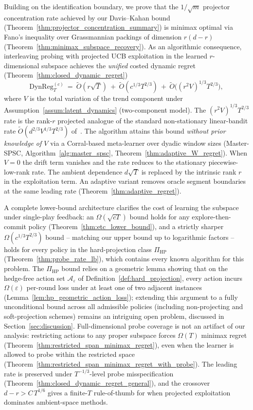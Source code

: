 \documentclass[11pt]{article}
\newcommand{\cA}{\mathcal{A}}
\newcommand{\DynReg}{\mathrm{DynReg}}
\begin{document}
Building on the identification boundary, we prove that the
$1/\sqrt{m}$ projector concentration rate achieved by our Davis--Kahan
bound (Theorem~\ref{thm:projector_concentration_summary}) is minimax
optimal via Fano's inequality over Grassmannian packings of dimension
$r(d{-}r)$ (Theorem~\ref{thm:minimax_subspace_recovery}).
As an algorithmic consequence, interleaving probing with
projected UCB exploitation in the learned $r$-dimensional subspace
achieves the \emph{unified} costed dynamic regret
(Theorem~\ref{thm:closed_dynamic_regret})
\[
  \DynReg_T^{(c)}\ =\ \widetilde{O}(r\sqrt T)\ +\ \widetilde{O}(c^{1/3}T^{2/3})\ +\ \widetilde{O}\!\bigl((r^2V)^{1/3}T^{2/3}\bigr),
\]
where $V$ is the total variation of the trend component under
Assumption~\ref{assum:latent_dynamics} (two-component model).
The $(r^2V)^{1/3}T^{2/3}$ rate is the rank-$r$ projected analogue of the
standard non-stationary linear-bandit rate $\widetilde O(d^{2/3}V^{1/3}T^{2/3})$
of~\citet{russac2019weighted,cheung2019learning}.
The algorithm attains this bound \emph{without prior knowledge of $V$} via a
Corral-based meta-learner over dyadic window sizes (Master-SPSC,
Algorithm~\ref{alg:master_spsc}, Theorem~\ref{thm:adaptive_W_regret}).
When $V=0$ the drift term vanishes and the rate reduces to the stationary
piecewise-low-rank rate.  The ambient dependence $d\sqrt T$ is replaced by the
intrinsic rank $r$ in the exploitation term.
An adaptive variant removes oracle segment boundaries at the same leading rate
(Theorem~\ref{thm:adaptive_regret}).

A complete lower-bound architecture clarifies the cost of learning the
subspace under single-play feedback: an $\Omega(\sqrt{cT})$ bound holds for
any explore-then-commit policy
(Theorem~\ref{thm:etc_lower_bound}), and a strictly sharper
$\Omega(c^{1/3}T^{2/3})$ bound -- matching our upper bound up to
logarithmic factors -- holds for every policy in the hard-projection class
$\Pi_{\mathrm{HP}}$ (Theorem~\ref{thm:probe_rate_lb}), which contains every
known algorithm for this problem.
The $\Pi_{\mathrm{HP}}$ bound relies on a geometric lemma showing that on
the hedge-free action set $\cA_\varepsilon$ of
Definition~\ref{def:hard_projection}, every action incurs
$\Omega(\varepsilon)$ per-round loss under at least one of two adjacent
instances (Lemma~\ref{lem:hp_geometric_action_loss}); extending this
argument to a fully unconditional bound across all admissible policies
(including non-projecting and soft-projection schemes) remains an
intriguing open problem, discussed in Section~\ref{sec:discussion}.
Full-dimensional probe coverage is not an artifact of our analysis: restricting
actions to any proper subspace forces $\Omega(T)$ minimax regret
(Theorem~\ref{thm:restricted_span_minimax_regret}), even when the learner
is allowed to probe within the restricted space
(Theorem~\ref{thm:restricted_span_minimax_regret_with_probe}).
The leading rate is preserved under $T^{-1/3}$-level probe misspecification
(Theorem~\ref{thm:closed_dynamic_regret_general}), and the crossover
$d-r > C\,T^{1/6}$ gives a finite-$T$ rule-of-thumb for when projected
exploitation dominates ambient-space methods.
\end{document}
